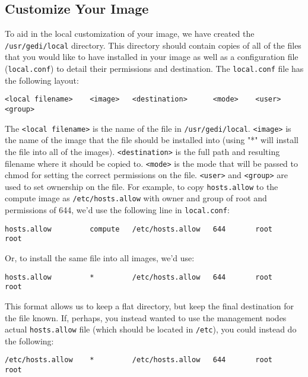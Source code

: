 \documentclass[10pt,a4paper,titlepage]{article}
\begin{document}
\subsection{Customize Your Image}
To aid in the local customization of your image, we have created the
\verb!/usr/gedi/local! directory.  This directory should contain copies of all
of the files that you would like to have installed in your image as well as a
configuration file (\verb!local.conf!) to detail their permissions and
destination.  The \verb!local.conf! file has the following layout:

\begin{verbatim}
<local filename>    <image>   <destination>      <mode>    <user>    <group>
\end{verbatim}

The \verb!<local filename>! is the name of the file in \verb!/usr/gedi/local!.  
\verb!<image>! is the name of the image that the file should be installed into
(using "*" will install the file into all of the images).  \verb!<destination>!
is the full path and resulting filename where it should be copied to.
\verb!<mode>! is the mode that will be passed to chmod for setting the correct
permissions on the file.  \verb!<user>! and \verb!<group>! are used to set
ownership on the file.  For example, to copy \verb!hosts.allow! to the compute
image as \verb!/etc/hosts.allow! with owner and group of root and permissions of
644, we'd use the following line in \verb!local.conf!:

\begin{verbatim}
hosts.allow         compute   /etc/hosts.allow   644       root      root
\end{verbatim}

Or, to install the same file into all images, we'd use:

\begin{verbatim}
hosts.allow         *         /etc/hosts.allow   644       root      root
\end{verbatim}

This format allows us to keep a flat directory, but keep the final destination
for the file known.  If, perhaps, you instead wanted to use the management nodes
actual \verb!hosts.allow! file (which should be located in \verb!/etc!), you
could instead do the following:

\begin{verbatim}
/etc/hosts.allow    *         /etc/hosts.allow   644       root      root
\end{verbatim}
\end{document}
